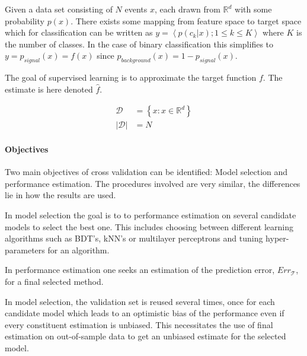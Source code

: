 
Given a data set consisting of $N$ events $x$, each drawn from $\mathbb{R}^{d}$ with some probability $p(x)$. There exists some mapping from feature space to target space which for classification can be written as $y = \left<p(c_k | x); 1 \leq k \leq K\right>$ where $K$ is the number of classes. In the case of binary classification this simplifies to $y = p_{signal}(x) = f(x)$ since $p_{background}(x) = 1 - p_{signal}(x)$.

The goal of supervised learning is to approximate the target function $f$. The estimate is here denoted $\hat{f}$.

\begin{align}
\mathcal{D} &= \left\{x : x \in \mathbb{R}^{d}\right\} \\
|\mathcal{D}| &= N
\end{align}

\paragraph{Objectives}
Two main objectives of cross validation can be identified: Model selection and performance estimation. The procedures involved are very similar, the differences lie in how the results are used.

In model selection the goal is to to performance estimation on several candidate models to select the best one. This includes choosing between different learning algorithms such as BDT's, kNN's or multilayer perceptrons and tuning hyper-parameters for an algorithm.

In performance estimation one seeks an estimation of the prediction error, $Err_{\mathcal{T}}$, for a final selected method.

In model selection, the validation set is reused several times, once for each candidate model which leads to an optimistic bias of the performance even if every constituent estimation is unbiased.  This necessitates the use of final estimation on out-of-sample data to get an unbiased estimate for the selected model.


